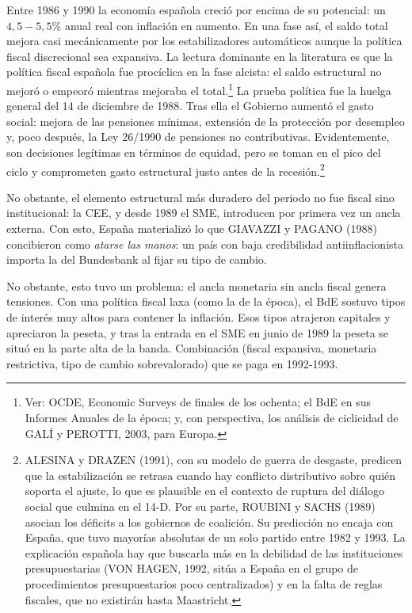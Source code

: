 \documentclass[10pt,a4paper]{article}
\begin{document}
Entre 1986 y 1990 la economía española creció por encima de su potencial: un $4,5-5,5\%$ anual real con inflación en aumento. En una fase así, el saldo total mejora casi mecánicamente por los estabilizadores automáticos aunque la política fiscal discrecional sea expansiva. La lectura dominante en la literatura es que la política fiscal española fue procíclica en la fase alcista: el saldo estructural no mejoró o empeoró mientras mejoraba el total.\footnote{%
    Ver: OCDE, Economic Surveys de finales de los ochenta; el BdE en sus Informes Anuales de la época; y, con perspectiva, los análisis de ciclicidad de GALÍ y PEROTTI, 2003, para Europa.
} La prueba política fue la huelga general del 14 de diciembre de 1988. Tras ella el Gobierno aumentó el gasto social: mejora de las pensiones mínimas, extensión de la protección por desempleo y, poco después, la Ley 26/1990 de pensiones no contributivas. Evidentemente, son decisiones legítimas en términos de equidad, pero se toman en el pico del ciclo y comprometen gasto estructural justo antes de la recesión.\footnote{%
    ALESINA y DRAZEN (1991), con su modelo de guerra de desgaste, predicen que la estabilización se retrasa cuando hay conflicto distributivo sobre quién soporta el ajuste, lo que es plausible en el contexto de ruptura del diálogo social que culmina en el 14-D. Por su parte, ROUBINI y SACHS (1989) asocian los déficits a los gobiernos de coalición. Su predicción no encaja con España, que tuvo mayorías absolutas de un solo partido entre 1982 y 1993. La explicación española hay que buscarla más en la debilidad de las instituciones presupuestarias (VON HAGEN, 1992, sitúa a España en el grupo de procedimientos presupuestarios poco centralizados) y en la falta de reglas fiscales, que no existirán hasta Maastricht.
}

No obstante, el elemento estructural más duradero del periodo no fue fiscal sino institucional: la CEE, y desde 1989 el SME, introducen por primera vez un ancla externa. Con esto, España materializó lo que GIAVAZZI y PAGANO (1988) concibieron como \textit{atarse las manos}: un país con baja credibilidad antiinflacionista importa la del Bundesbank al fijar su tipo de cambio. 

No obstante, esto tuvo un problema: el ancla monetaria sin ancla fiscal genera tensiones. Con una política fiscal laxa (como la de la época), el BdE sostuvo tipos de interés muy altos para contener la inflación. Esos tipos atrajeron capitales y apreciaron la peseta, y tras la entrada en el SME en junio de 1989 la peseta se situó en la parte alta de la banda. Combinación (fiscal expansiva, monetaria restrictiva, tipo de cambio sobrevalorado) que se paga en 1992-1993.
\end{document}
